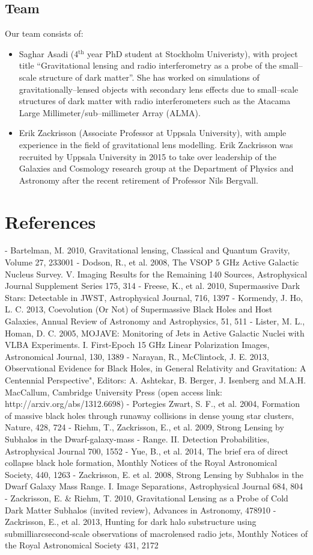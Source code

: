 \documentclass[a4paper, 11pt]{article}
\begin{document}
\subsection{Team}
Our team consists of:
\begin{itemize}
\item Saghar Asadi (4$^\mathrm{th}$ year PhD student at Stockholm Univeristy), with project title ``Gravitational lensing and radio interferometry as a probe of the small--scale structure of dark matter''. She has worked on simulations of gravitationally--lensed objects with secondary lens effects due to small--scale structures of dark matter with radio interferometers such as the Atacama Large Millimeter/sub--millimeter Array (ALMA).
\item Erik Zackrisson (Associate Professor at Uppsala University), with ample experience in the field of gravitational lens modelling. Erik Zackrisson was recruited by Uppsala University in 2015 to take over leadership of the Galaxies and Cosmology research group at the Department of Physics and Astronomy after the recent retirement of Professor Nils Bergvall.
\end{itemize}
\section*{References}
- Bartelman, M. 2010, Gravitational lensing, Classical and Quantum Gravity, Volume 27, 233001
- Dodson, R., et al. 2008, The VSOP 5 GHz Active Galactic Nucleus Survey. V. Imaging Results for the Remaining 140 Sources, Astrophysical Journal Supplement Series 175, 314
- Freese, K., et al. 2010, Supermassive Dark Stars: Detectable in JWST, Astrophysical Journal, 716, 1397
- Kormendy, J. Ho, L. C. 2013, Coevolution (Or Not) of Supermassive Black Holes and Host Galaxies, Annual Review of Astronomy and Astrophysics, 51, 511
- Lister, M. L., Homan, D. C. 2005, MOJAVE: Monitoring of Jets in Active Galactic Nuclei with VLBA Experiments. I. First-Epoch 15 GHz Linear Polarization Images, Astronomical Journal, 130, 1389
- Narayan, R., McClintock, J. E. 2013, Observational Evidence for Black Holes, in General Relativity and Gravitation: A Centennial Perspective", Editors: A. Ashtekar, B. Berger, J. Isenberg and M.A.H. MacCallum, Cambridge University Press (open access link: http://arxiv.org/abs/1312.6698)
- Portegies Zwart, S. F., et al. 2004, Formation of massive black holes through runaway collisions in dense young star clusters, Nature, 428, 724
- Riehm, T., Zackrisson, E., et al. 2009, Strong Lensing by Subhalos in the Dwarf-galaxy-mass
- Range. II. Detection Probabilities, Astrophysical Journal 700, 1552
- Yue, B., et al. 2014, The brief era of direct collapse black hole formation, Monthly Notices of the Royal Astronomical Society, 440, 1263
- Zackrisson, E. et al. 2008, Strong Lensing by Subhalos in the Dwarf Galaxy Mass Range. I. Image Separations, Astrophysical Journal 684, 804
- Zackrisson, E. \& Riehm, T. 2010, Gravitational Lensing as a Probe of Cold Dark Matter Subhalos (invited review), Advances in Astronomy, 478910
- Zackrisson, E., et al. 2013, Hunting for dark halo substructure using submilliarcsecond-scale observations of macrolensed radio jets, Monthly Notices of the Royal Astronomical Society 431, 2172
\end{document}
